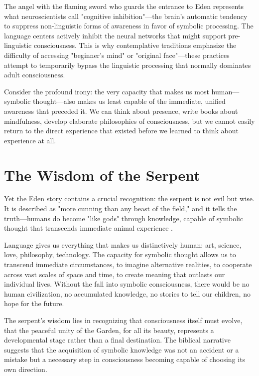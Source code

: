 The angel with the flaming sword who guards the entrance to Eden represents what neuroscientists call "cognitive inhibition"—the brain's automatic tendency to suppress non-linguistic forms of awareness in favor of symbolic processing. The language centers actively inhibit the neural networks that might support pre-linguistic consciousness. This is why contemplative traditions emphasize the difficulty of accessing "beginner's mind" or "original face"—these practices attempt to temporarily bypass the linguistic processing that normally dominates adult consciousness.

Consider the profound irony: the very capacity that makes us most human—symbolic thought—also makes us least capable of the immediate, unified awareness that preceded it. We can think about presence, write books about mindfulness, develop elaborate philosophies of consciousness, but we cannot easily return to the direct experience that existed before we learned to think about experience at all.

\section{The Wisdom of the Serpent}

Yet the Eden story contains a crucial recognition: the serpent is not evil but wise. It is described as "more cunning than any beast of the field," and it tells the truth—humans do become "like gods" through knowledge, capable of symbolic thought that transcends immediate animal experience \parencite{genesis3:1,genesis3:5}.

Language gives us everything that makes us distinctively human: art, science, love, philosophy, technology. The capacity for symbolic thought allows us to transcend immediate circumstances, to imagine alternative realities, to cooperate across vast scales of space and time, to create meaning that outlasts our individual lives. Without the fall into symbolic consciousness, there would be no human civilization, no accumulated knowledge, no stories to tell our children, no hope for the future.

The serpent's wisdom lies in recognizing that consciousness itself must evolve, that the peaceful unity of the Garden, for all its beauty, represents a developmental stage rather than a final destination. The biblical narrative suggests that the acquisition of symbolic knowledge was not an accident or a mistake but a necessary step in consciousness becoming capable of choosing its own direction.

